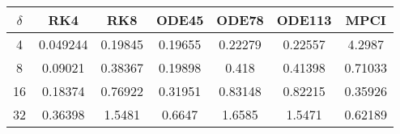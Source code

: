 \begin{tabular}{ccccccc}
\hline
$\delta$ & RK4 & RK8 & ODE45 & ODE78 & ODE113 & MPCI\\ 
\hline 
4 & 0.049244 & 0.19845 & 0.19655 & 0.22279 & 0.22557 & 4.2987\\ 
8 & 0.09021 & 0.38367 & 0.19898 & 0.418 & 0.41398 & 0.71033\\ 
16 & 0.18374 & 0.76922 & 0.31951 & 0.83148 & 0.82215& 0.35926 \\ 
32 & 0.36398 & 1.5481 & 0.6647 & 1.6585 & 1.5471& 0.62189\\ 
\hline 
\end{tabular}